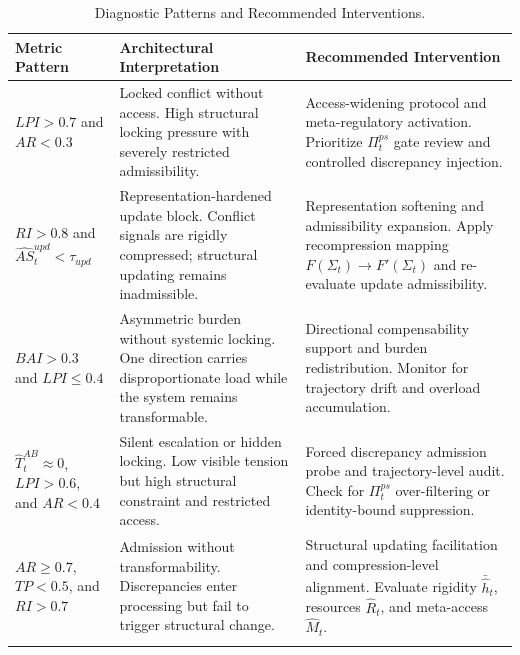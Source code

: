 \documentclass[11pt,a4paper]{article}
\theoremstyle{breakstyle}
\newcommand{\Sig}{\Sigma}
\newcommand{\That}{\widehat{T}}
\newcommand{\Rhat}{\widehat{R}}
\newcommand{\Mhat}{\widehat{M}}
\begin{document}
	\begin{table}[h!]
		\centering
		\small
		\renewcommand{\arraystretch}{1.15}
		\caption{Diagnostic Patterns and Recommended Interventions.}
		\label{tab:interpretation-guide}
		\begin{tabular}{@{}p{4.0cm}p{4.4cm}p{4.8cm}@{}}
			\toprule
			\textbf{Metric Pattern} & \textbf{Architectural Interpretation} & \textbf{Recommended Intervention} \\
			\midrule
			
			$LPI > 0.7$ and $AR < 0.3$
			&
			Locked conflict without access. High structural locking pressure with severely restricted admissibility.
			&
			Access-widening protocol and meta-regulatory activation. Prioritize $\Pi^{ps}_t$ gate review and controlled discrepancy injection.
			\\
			\addlinespace
			
			$RI > 0.8$ and $\widehat{AS}^{upd}_t < \tau_{upd}$
			&
			Representation-hardened update block. Conflict signals are rigidly compressed; structural updating remains inadmissible.
			&
			Representation softening and admissibility expansion. Apply recompression mapping $F(\Sig_t)\rightarrow F'(\Sig_t)$ and re-evaluate update admissibility.
			\\
			\addlinespace
			
			$BAI > 0.3$ and $LPI \leq 0.4$
			&
			Asymmetric burden without systemic locking. One direction carries disproportionate load while the system remains transformable.
			&
			Directional compensability support and burden redistribution. Monitor for trajectory drift and overload accumulation.
			\\
			\addlinespace
			
			$\That^{AB}_t \approx 0$, $LPI > 0.6$, and $AR < 0.4$
			&
			Silent escalation or hidden locking. Low visible tension but high structural constraint and restricted access.
			&
			Forced discrepancy admission probe and trajectory-level audit. Check for $\Pi^{ps}_t$ over-filtering or identity-bound suppression.
			\\
			\addlinespace
			
			$AR \geq 0.7$, $TP < 0.5$, and $RI > 0.7$
			&
			Admission without transformability. Discrepancies enter processing but fail to trigger structural change.
			&
			Structural updating facilitation and compression-level alignment. Evaluate rigidity $\bar{\hat{h}}_t$, resources $\Rhat_t$, and meta-access $\Mhat_t$.
			\\
			\addlinespace
			

\end{tabular}
\end{table}
\end{document}
